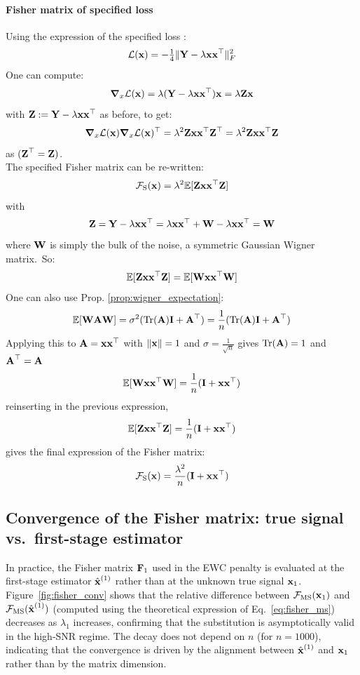 \documentclass[11pt]{article}
\begin{document}
\begin{rem}
\paragraph{Fisher matrix of specified loss}
Using the expression of the specified loss :
\[
    \mathcal{L}(\vect{x}) = -\tfrac{1}{4} \|\vect Y - \lambda\vect{x}\vect{x}^\top\|_F^2
\]
One can compute:
\[
    \vect \nabla_x \mathcal{L}(\vect{x}) = \lambda(\vect Y - \lambda \vect{x} \vect{x}^\top) \vect{x} = \lambda \vect Z \vect{x}
\]
with $\vect Z := \vect Y - \lambda\vect{x} \vect{x}^\top$ as before, to get:
\[
    \vect \nabla_x \mathcal{L}(\vect{x}) \vect \nabla_x \mathcal{L}(\vect{x})^\top = \lambda^2\vect Z \vect{x} \vect{x}^\top \vect Z^\top = \lambda^2\vect Z \vect{x}\vect{x}^\top \vect Z
\]
as $(\vect Z^\top = \vect Z)$. \\
The specified Fisher matrix can be re-written:
\[
    \mathcal{F}_{\mathrm{S}}(\vect{x}) = \lambda^2\mathbb{E}[\vect Z \vect{x}\vect{x}^\top \vect Z]
\]
with
\[
    \vect Z =\vect Y - \lambda\vect{x} \vect{x}^\top = \lambda \vect{x} \vect{x}^\top + \vect W  - \lambda \vect{x} \vect{x}^\top= \vect W
\]
where $\vect W$ is simply the bulk of the noise, a symmetric Gaussian Wigner matrix.\
So:
\[
\mathbb{E} [\vect Z \vect{x} \vect{x}^\top \vect Z] = \mathbb{E}[\vect W \vect{x} \vect{x}^\top \vect W]
\]
One can also use Prop. \ref{prop:wigner_expectation}:
\[
    \mathbb{E}[\vect W \vect A \vect W] = \sigma^2(\mathrm{Tr}(\vect A) \vect I + \vect A^\top) = \frac{1}{n}(\mathrm{Tr}(\vect A) \vect I +\vect A^\top)
\]
\noindent
Applying this to $\vect A = \vect{x} \vect{x}^\top$ with $\|\vect{x}\| = 1$ and $\sigma = \frac{1}{\sqrt{n}}$ gives
$\mathrm{Tr}(\vect A) = 1$ and $\vect A^\top = \vect A$
\[
\mathbb{E}[\vect W \vect{x} \vect{x}^\top \vect W] = \frac{1}{n}(\vect I +\vect{x} \vect{x}^\top)
\]
reinserting in the previous expression,
\[
\mathbb{E}[\vect Z \vect{x}\vect{x}^\top \vect Z] = \frac{1}{n}(\vect I + \vect{x} \vect{x}^\top)
\]
gives the final expression of the Fisher matrix:
\begin{equation}
    \mathcal{F}_{\mathrm{S}}(\vect{x}) = \frac{\lambda^2}{n}(\vect I + \vect{x}\vect{x}^\top )
\end{equation}
\subsection{Convergence of the Fisher matrix: true signal vs.\ first-stage estimator}
\label{adix:fisher-conv}

In practice, the Fisher matrix $\vect{F}_1$ used in the EWC penalty is evaluated at the first-stage estimator $\hat{\vect{x}}^{(1)}$ rather than at the unknown true signal $\vect{x}_1$. Figure~\ref{fig:fisher_conv} shows that the relative difference between $\mathcal{F}_{\mathrm{MS}}(\vect{x}_1)$ and $\mathcal{F}_{\mathrm{MS}}(\hat{\vect{x}}^{(1)})$ (computed using the theoretical expression of Eq.~\eqref{eq:fisher_ms}) decreases as $\lambda_1$ increases, confirming that the substitution is asymptotically valid in the high-SNR regime. The decay does not depend on $n$ (for $n=1000$), indicating that the convergence is driven by the alignment between $\hat{\vect{x}}^{(1)}$ and $\vect{x}_1$ rather than by the matrix dimension.


\end{rem}
\end{document}
